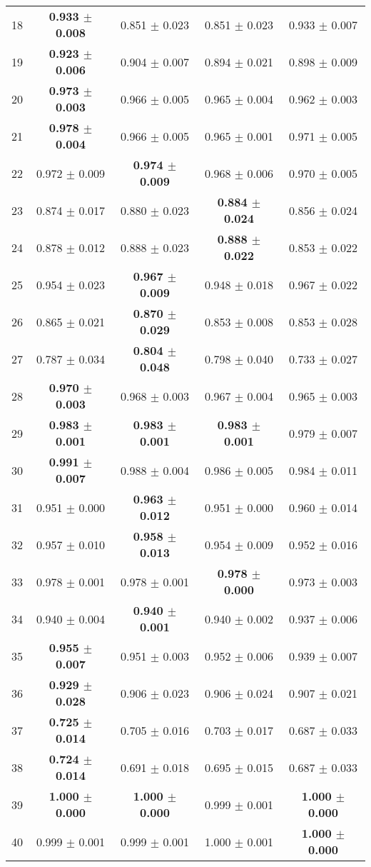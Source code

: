 \begin{table}[!ht]
{\begin{tabular}{r c c c c}
18 & \textbf{0.933 $\pm$ 0.008} & 0.851 $\pm$ 0.023 & 0.851 $\pm$ 0.023 & 0.933 $\pm$ 0.007 \\
19 & \textbf{0.923 $\pm$ 0.006} & 0.904 $\pm$ 0.007 & 0.894 $\pm$ 0.021 & 0.898 $\pm$ 0.009 \\
20 & \textbf{0.973 $\pm$ 0.003} & 0.966 $\pm$ 0.005 & 0.965 $\pm$ 0.004 & 0.962 $\pm$ 0.003 \\
21 & \textbf{0.978 $\pm$ 0.004} & 0.966 $\pm$ 0.005 & 0.965 $\pm$ 0.001 & 0.971 $\pm$ 0.005 \\
22 & 0.972 $\pm$ 0.009 & \textbf{0.974 $\pm$ 0.009} & 0.968 $\pm$ 0.006 & 0.970 $\pm$ 0.005 \\
23 & 0.874 $\pm$ 0.017 & 0.880 $\pm$ 0.023 & \textbf{0.884 $\pm$ 0.024} & 0.856 $\pm$ 0.024 \\
24 & 0.878 $\pm$ 0.012 & 0.888 $\pm$ 0.023 & \textbf{0.888 $\pm$ 0.022} & 0.853 $\pm$ 0.022 \\
25 & 0.954 $\pm$ 0.023 & \textbf{0.967 $\pm$ 0.009} & 0.948 $\pm$ 0.018 & 0.967 $\pm$ 0.022 \\
26 & 0.865 $\pm$ 0.021 & \textbf{0.870 $\pm$ 0.029} & 0.853 $\pm$ 0.008 & 0.853 $\pm$ 0.028 \\
27 & 0.787 $\pm$ 0.034 & \textbf{0.804 $\pm$ 0.048} & 0.798 $\pm$ 0.040 & 0.733 $\pm$ 0.027 \\
28 & \textbf{0.970 $\pm$ 0.003} & 0.968 $\pm$ 0.003 & 0.967 $\pm$ 0.004 & 0.965 $\pm$ 0.003 \\
29 & \textbf{0.983 $\pm$ 0.001} & \textbf{0.983 $\pm$ 0.001} & \textbf{0.983 $\pm$ 0.001} & 0.979 $\pm$ 0.007 \\
30 & \textbf{0.991 $\pm$ 0.007} & 0.988 $\pm$ 0.004 & 0.986 $\pm$ 0.005 & 0.984 $\pm$ 0.011 \\
31 & 0.951 $\pm$ 0.000 & \textbf{0.963 $\pm$ 0.012} & 0.951 $\pm$ 0.000 & 0.960 $\pm$ 0.014 \\
32 & 0.957 $\pm$ 0.010 & \textbf{0.958 $\pm$ 0.013} & 0.954 $\pm$ 0.009 & 0.952 $\pm$ 0.016 \\
33 & 0.978 $\pm$ 0.001 & 0.978 $\pm$ 0.001 & \textbf{0.978 $\pm$ 0.000} & 0.973 $\pm$ 0.003 \\
34 & 0.940 $\pm$ 0.004 & \textbf{0.940 $\pm$ 0.001} & 0.940 $\pm$ 0.002 & 0.937 $\pm$ 0.006 \\
35 & \textbf{0.955 $\pm$ 0.007} & 0.951 $\pm$ 0.003 & 0.952 $\pm$ 0.006 & 0.939 $\pm$ 0.007 \\
36 & \textbf{0.929 $\pm$ 0.028} & 0.906 $\pm$ 0.023 & 0.906 $\pm$ 0.024 & 0.907 $\pm$ 0.021 \\
37 & \textbf{0.725 $\pm$ 0.014} & 0.705 $\pm$ 0.016 & 0.703 $\pm$ 0.017 & 0.687 $\pm$ 0.033 \\
38 & \textbf{0.724 $\pm$ 0.014} & 0.691 $\pm$ 0.018 & 0.695 $\pm$ 0.015 & 0.687 $\pm$ 0.033 \\
39 & \textbf{1.000 $\pm$ 0.000} & \textbf{1.000 $\pm$ 0.000} & 0.999 $\pm$ 0.001 & \textbf{1.000 $\pm$ 0.000} \\
40 & 0.999 $\pm$ 0.001 & 0.999 $\pm$ 0.001 & 1.000 $\pm$ 0.001 & \textbf{1.000 $\pm$ 0.000} \\
\end{tabular}}
\end{table}
